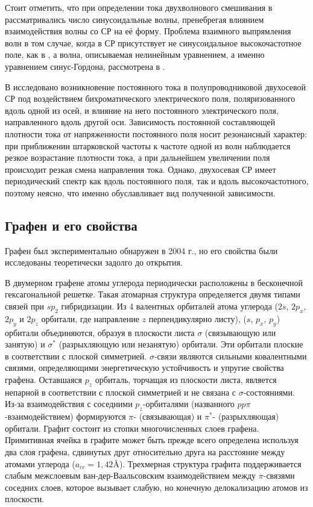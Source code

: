 Стоит отметить, что при определении тока двухволнового смешивания в \cite{mensah} рассматривались число синусоидальные волны, пренебрегая влиянием взаимодействия волны со СР на её форму. Проблема взаимного выпрямления волн в том случае, когда в СР присутствует не синусоидальное высокочастотное поле, как в \cite{mensah}, а волна, описываемая нелинейным уравнением, а именно уравнением синус-Гордона, рассмотрена в \cite{cnoidal-and-sinusoidal}.

В \cite{two-axis-sl} исследовано возникновение постоянного тока в полупроводниковой двухосевой СР под воздействием бихроматического электрического поля, поляризованного вдоль одной из осей, и влияние на него постоянного электрического поля, направленного вдоль другой оси. Зависимость постоянной составляющей плотности тока от напряженности постоянного поля носит резонансный характер: при приближении штарковской частоты к частоте одной из волн наблюдается резкое возрастание плотности тока, а при дальнейшем увеличении поля происходит резкая смена направления тока. Однако, двухосевая СР имеет периодический спектр как вдоль постоянного поля, так и вдоль высокочастотного, поэтому неясно, что именно обуславливает вид полученной зависимости.

\subsection{Графен и его свойства}
Графен был экспериментально обнаружен в 2004 г., но его свойства были исследованы теоретически задолго до открытия.

В двумерном графене атомы углерода периодически расположены в бесконечной гексагональной решетке. Такая атомарная структура определяется двумя типами связей при \( sp_2 \) гибридизации. Из 4 валентных орбиталей атома углерода (\(2s\), \(2p_x\), \(2p_y\) и \(2p_z\) орбитали, где направление \(z\) перпендикулярно листу), (\(s\), \(p_x\), \(p_y\)) орбитали объединяются, образуя в плоскости листа \(\sigma\) (связывающую или занятую) и \(\sigma^*\) (разрыхляющую или незанятую) орбитали. Эти орбитали плоские в соответствии с плоской симметрией. \(\sigma\)-связи являются сильными ковалентными связями, определяющими энергетическую устойчивость и упругие свойства графена. Оставшаяся \( p_z \) орбиталь, торчащая из плоскости листа, является непарной в соответствии с плоской симметрией и не связана с \(\sigma\)-состояниями. Из-за взаимодействия с соседними \( p_z \)-орбиталями (названного \(pp\pi\)-взаимодействием) формируются \(\pi\)- (связывающая) и \(\pi^*\)- (разрыхляющая) орбитали. Графит состоит из стопки многочисленных слоев графена. Примитивная ячейка в графите может быть прежде всего определена используя два слоя графена, сдвинутых друг относительно друга на расстояние между атомами углерода (\(a_{cc} = 1,\!42 \text{\AA}\)). Трехмерная структура графита поддерживается слабым межслоевым ван-дер-Ваальсовским взаимодействием между \(\pi\)-связями соседних слоев, которое вызывает слабую, но конечную делокализацию атомов из плоскости.

